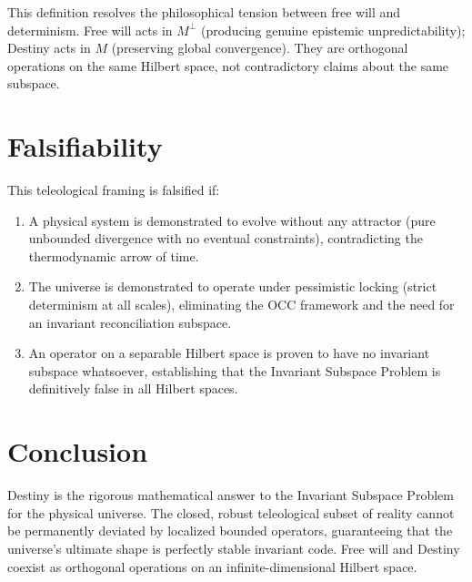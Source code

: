 \documentclass[12pt, a4paper]{article}
\theoremstyle{plain}
\theoremstyle{definition}
\begin{document}
\begin{remark}
This definition resolves the philosophical tension between free will and determinism. Free will acts in $M^\perp$ (producing genuine epistemic unpredictability); Destiny acts in $M$ (preserving global convergence). They are orthogonal operations on the same Hilbert space, not contradictory claims about the same subspace.
\end{remark}

\section{Falsifiability}\label{sec:falsifiability}

\begin{proposition}
This teleological framing is falsified if:
\begin{enumerate}
    \item A physical system is demonstrated to evolve without any attractor (pure unbounded divergence with no eventual constraints), contradicting the thermodynamic arrow of time.
    \item The universe is demonstrated to operate under pessimistic locking (strict determinism at all scales), eliminating the OCC framework and the need for an invariant reconciliation subspace.
    \item An operator on a separable Hilbert space is proven to have no invariant subspace whatsoever, establishing that the Invariant Subspace Problem is definitively false in all Hilbert spaces.
\end{enumerate}
\end{proposition}

\section{Conclusion}

Destiny is the rigorous mathematical answer to the Invariant Subspace Problem for the physical universe. The closed, robust teleological subset of reality cannot be permanently deviated by localized bounded operators, guaranteeing that the universe's ultimate shape is perfectly stable invariant code. Free will and Destiny coexist as orthogonal operations on an infinite-dimensional Hilbert space.

\vspace{2em}
\noindent\hrulefill
\vspace{1em}







\vspace{3em}
\noindent\hrulefill
\vspace{1em}
\end{document}
